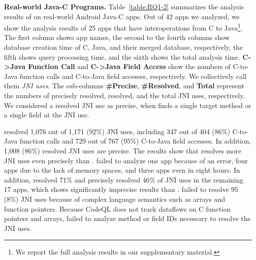 

\textbf{Real-world Java-C Programs.} Table~\ref{table:RQ1-2} summarizes the
analysis results of \ours on real-world Android Java-C apps.
Out of 42 apps we analyzed, we show the analysis results of 25 apps that have
interoperations from C to Java\footnote{We report the full analysis results in
our supplementary material.}.
The first column shows app names, the second to the fourth columns show
database creation time of C, Java, and their merged database, respectively, the
fifth shows query processing time, and the sixth shows the total analysis time.
{\bf C->Java Function Call} and {\bf C->Java Field Access} show the numbers of
C-to-Java function calls and C-to-Java field accesses, respectively. We
collectively call them \emph{JNI uses}.
The sub-columns {\bf \#Precise}, {\bf \#Resolved}, and {\bf Total} represent
the numbers of precisely resolved, resolved, and the total JNI uses,
respectively.
We considered a resolved JNI use as precise, when \ours finds a single target
method or a single field at the JNI use.


\ours resolved 1,076 out of 1,171 (92\%) JNI uses, including 347 out of 404
(86\%) C-to-Java function calls and 729 out of 767 (95\%) C-to-Java field
accesses. 
In addition, 1,008 (86\%) resolved JNI uses are precise.
The results show that \ours resolves more JNI uses even precisely than \lees. 
\lees failed to analyze one app because of an error, four apps due to the lack
of memory spaces, and three apps even in eight hours.  
In addition, \lees resolved 71\% and precisely resolved 46\% of JNI uses in the
remaining 17 apps, which shows significantly imprecise results than \ours.
%
\ours failed to resolve 95 (8\%) JNI uses because of complex language semantics
such as arrays and function pointers.  
Because CodeQL does not track dataflows on C function pointers and arrays,
\ours failed to analyze method or field IDs necessary to resolve the JNI uses.



